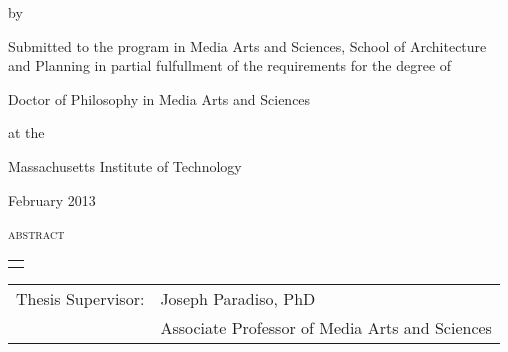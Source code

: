\thispagestyle{empty}

\begingroup
\let\clearpage\relax
\let\cleardoublepage\relax
\let\cleardoublepage\relax

\begin{addmargin}[1cm]{-3cm}
\begin{samepage}
{\centering

    \begingroup
        \color{Maroon}
        {\Large\textsc{\myTitle}}
    \endgroup

    by

    \myName

    \vspace{4mm}

 Submitted to the program in Media Arts and Sciences, School of
 Architecture and Planning in partial fulfullment of the requirements
 for the degree of

    \vspace{2mm}

Doctor of Philosophy in Media Arts and Sciences

at the

Massachusetts Institute of Technology

    \vspace{2mm}

February 2013



}

{\Large{\textsc{abstract}}}

\begin{tabular}{p{12cm}}
\hline\\
\end{tabular}


{\small

}

\vspace{4mm}
\noindent
\begin{tabular}{rl}
Thesis Supervisor:&Joseph Paradiso, PhD\\
                  &Associate Professor of Media Arts and Sciences
\end{tabular}

\end{samepage}

\end{addmargin}
\endgroup

